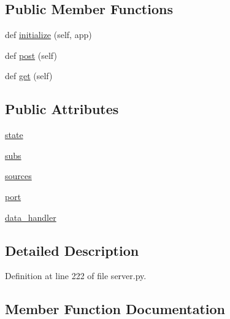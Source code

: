 \subsection*{Public Member Functions}
\begin{DoxyCompactItemize}
\item 
def \hyperlink{classparlai_1_1mturk_1_1webapp_1_1server_1_1RunListHandler_aea5350b7ea1536cacfc3dfff4ffe1f32}{initialize} (self, app)
\item 
def \hyperlink{classparlai_1_1mturk_1_1webapp_1_1server_1_1RunListHandler_a7ecee21fd9a47687af7466e502bba574}{post} (self)
\item 
def \hyperlink{classparlai_1_1mturk_1_1webapp_1_1server_1_1RunListHandler_a66e2a62b37bbcc83c70b25bbbbd64952}{get} (self)
\end{DoxyCompactItemize}
\subsection*{Public Attributes}
\begin{DoxyCompactItemize}
\item 
\hyperlink{classparlai_1_1mturk_1_1webapp_1_1server_1_1RunListHandler_a69b59cd4194adf73ffdc4feae1409df3}{state}
\item 
\hyperlink{classparlai_1_1mturk_1_1webapp_1_1server_1_1RunListHandler_ae6ca04b925262123737c06bb6ce2bc4a}{subs}
\item 
\hyperlink{classparlai_1_1mturk_1_1webapp_1_1server_1_1RunListHandler_a5cc19eca1f894c97d99c01ff02a18e02}{sources}
\item 
\hyperlink{classparlai_1_1mturk_1_1webapp_1_1server_1_1RunListHandler_a31542b109794f0748607b209c07f1a61}{port}
\item 
\hyperlink{classparlai_1_1mturk_1_1webapp_1_1server_1_1RunListHandler_a5084daae3aa6f6de486452498adbc2a1}{data\+\_\+handler}
\end{DoxyCompactItemize}


\subsection{Detailed Description}


Definition at line 222 of file server.\+py.



\subsection{Member Function Documentation}
\mbox{\label{classparlai_1_1mturk_1_1webapp_1_1server_1_1RunListHandler_a66e2a62b37bbcc83c70b25bbbbd64952}} 
